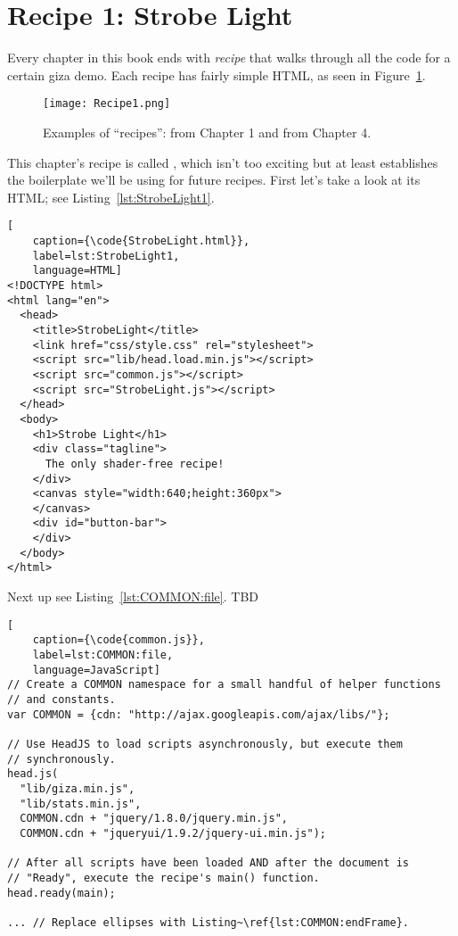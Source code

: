 \section{Recipe 1: Strobe Light}

Every chapter in this book ends with \emph{recipe} that walks through all the code for a certain giza demo.  Each recipe has fairly simple HTML, as seen in Figure~\ref{fig:Recipe1}.

\begin{figure}[htb]\centering
  \texttt{[image: Recipe1.png]}
  \caption{Examples of ``recipes'':  from Chapter 1 and  from Chapter 4.}
  \label{fig:Recipe1}
\end{figure}

This chapter's recipe is called , which isn't too exciting but at least establishes the boilerplate we'll be using for future recipes.  First let's take a look at its HTML; see Listing~\ref{lst:StrobeLight1}.

\begin{lstlisting}[
    caption={\code{StrobeLight.html}},
    label=lst:StrobeLight1,
    language=HTML]
<!DOCTYPE html>
<html lang="en">
  <head>
    <title>StrobeLight</title>
    <link href="css/style.css" rel="stylesheet">
    <script src="lib/head.load.min.js"></script>
    <script src="common.js"></script>
    <script src="StrobeLight.js"></script>
  </head>
  <body>
    <h1>Strobe Light</h1>
    <div class="tagline">
      The only shader-free recipe!
    </div>
    <canvas style="width:640;height:360px">
    </canvas>
    <div id="button-bar">
    </div>
  </body>
</html>
\end{lstlisting} 

Next up see Listing~\ref{lst:COMMON:file}.  TBD

\begin{lstlisting}[
    caption={\code{common.js}},
    label=lst:COMMON:file,
    language=JavaScript]
// Create a COMMON namespace for a small handful of helper functions
// and constants.
var COMMON = {cdn: "http://ajax.googleapis.com/ajax/libs/"};

// Use HeadJS to load scripts asynchronously, but execute them
// synchronously.
head.js(
  "lib/giza.min.js",
  "lib/stats.min.js",
  COMMON.cdn + "jquery/1.8.0/jquery.min.js",
  COMMON.cdn + "jqueryui/1.9.2/jquery-ui.min.js");

// After all scripts have been loaded AND after the document is
// "Ready", execute the recipe's main() function.
head.ready(main);

... // Replace ellipses with Listing~\ref{lst:COMMON:endFrame}.
\end{lstlisting} 

